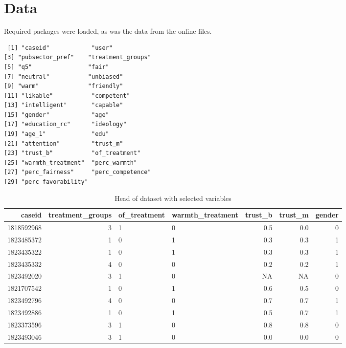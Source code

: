 \documentclass[12pt,letterpaper]{article}
\begin{document}
\section{Data}
	Required packages were loaded, as was the data from the online files.  
	 
	 
	\begin{Verbatim}
 [1] "caseid"            "user"             
[3] "pubsector_pref"    "treatment_groups" 
[5] "q5"                "fair"             
[7] "neutral"           "unbiased"         
[9] "warm"              "friendly"         
[11] "likable"           "competent"        
[13] "intelligent"       "capable"          
[15] "gender"            "age"              
[17] "education_rc"      "ideology"         
[19] "age_1"             "edu"              
[21] "attention"         "trust_m"          
[23] "trust_b"           "of_treatment"     
[25] "warmth_treatment"  "perc_warmth"      
[27] "perc_fairness"     "perc_competence"  
[29] "perc_favorability"
	\end{Verbatim}
	
	
	\begin{table}
		\caption{Head of dataset with selected variables}
		\begin{tabular}{rrllrrr}
			\toprule
			caseid & treatment\_groups & of\_treatment & warmth\_treatment & trust\_b & trust\_m & gender\\
			\midrule
			1818592968 & 3 & 1 & 0 & 0.5 & 0.0 & 0\\
			1823485372 & 1 & 0 & 1 & 0.3 & 0.3 & 1\\
			1823435322 & 1 & 0 & 1 & 0.3 & 0.3 & 1\\
			1823435332 & 4 & 0 & 0 & 0.2 & 0.2 & 1\\
			1823492020 & 3 & 1 & 0 & NA & NA & 0\\
			1821707542 & 1 & 0 & 1 & 0.6 & 0.5 & 0\\
			1823492796 & 4 & 0 & 0 & 0.7 & 0.7 & 1\\
			1823492886 & 1 & 0 & 1 & 0.5 & 0.7 & 1\\
			1823373596 & 3 & 1 & 0 & 0.8 & 0.8 & 0\\
			1823493046 & 3 & 1 & 0 & 0.0 & 0.0 & 0\\
			\bottomrule
		\end{tabular}
	\end{table}
	\FloatBarrier
	
\end{document}
